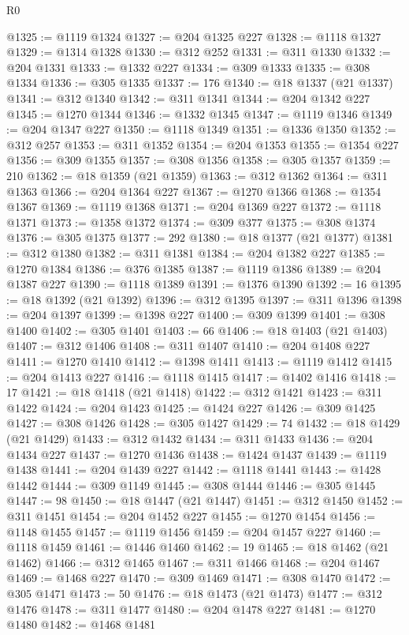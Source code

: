 \begin{lexlean}{R0}
\begin{coremodule}
@1325 := @1119 @1324
@1327 := @204 @1325 @227
@1328 := @1118 @1327
@1329 := @1314 @1328
@1330 := @312 @252
@1331 := @311 @1330
@1332 := @204 @1331
@1333 := @1332 @227
@1334 := @309 @1333
@1335 := @308 @1334
@1336 := @305 @1335
@1337 := 176
@1340 := @18 @1337 (@21 @1337)
@1341 := @312 @1340
@1342 := @311 @1341
@1344 := @204 @1342 @227
@1345 := @1270 @1344
@1346 := @1332 @1345
@1347 := @1119 @1346
@1349 := @204 @1347 @227
@1350 := @1118 @1349
@1351 := @1336 @1350
@1352 := @312 @257
@1353 := @311 @1352
@1354 := @204 @1353
@1355 := @1354 @227
@1356 := @309 @1355
@1357 := @308 @1356
@1358 := @305 @1357
@1359 := 210
@1362 := @18 @1359 (@21 @1359)
@1363 := @312 @1362
@1364 := @311 @1363
@1366 := @204 @1364 @227
@1367 := @1270 @1366
@1368 := @1354 @1367
@1369 := @1119 @1368
@1371 := @204 @1369 @227
@1372 := @1118 @1371
@1373 := @1358 @1372
@1374 := @309 @377
@1375 := @308 @1374
@1376 := @305 @1375
@1377 := 292
@1380 := @18 @1377 (@21 @1377)
@1381 := @312 @1380
@1382 := @311 @1381
@1384 := @204 @1382 @227
@1385 := @1270 @1384
@1386 := @376 @1385
@1387 := @1119 @1386
@1389 := @204 @1387 @227
@1390 := @1118 @1389
@1391 := @1376 @1390
@1392 := 16
@1395 := @18 @1392 (@21 @1392)
@1396 := @312 @1395
@1397 := @311 @1396
@1398 := @204 @1397
@1399 := @1398 @227
@1400 := @309 @1399
@1401 := @308 @1400
@1402 := @305 @1401
@1403 := 66
@1406 := @18 @1403 (@21 @1403)
@1407 := @312 @1406
@1408 := @311 @1407
@1410 := @204 @1408 @227
@1411 := @1270 @1410
@1412 := @1398 @1411
@1413 := @1119 @1412
@1415 := @204 @1413 @227
@1416 := @1118 @1415
@1417 := @1402 @1416
@1418 := 17
@1421 := @18 @1418 (@21 @1418)
@1422 := @312 @1421
@1423 := @311 @1422
@1424 := @204 @1423
@1425 := @1424 @227
@1426 := @309 @1425
@1427 := @308 @1426
@1428 := @305 @1427
@1429 := 74
@1432 := @18 @1429 (@21 @1429)
@1433 := @312 @1432
@1434 := @311 @1433
@1436 := @204 @1434 @227
@1437 := @1270 @1436
@1438 := @1424 @1437
@1439 := @1119 @1438
@1441 := @204 @1439 @227
@1442 := @1118 @1441
@1443 := @1428 @1442
@1444 := @309 @1149
@1445 := @308 @1444
@1446 := @305 @1445
@1447 := 98
@1450 := @18 @1447 (@21 @1447)
@1451 := @312 @1450
@1452 := @311 @1451
@1454 := @204 @1452 @227
@1455 := @1270 @1454
@1456 := @1148 @1455
@1457 := @1119 @1456
@1459 := @204 @1457 @227
@1460 := @1118 @1459
@1461 := @1446 @1460
@1462 := 19
@1465 := @18 @1462 (@21 @1462)
@1466 := @312 @1465
@1467 := @311 @1466
@1468 := @204 @1467
@1469 := @1468 @227
@1470 := @309 @1469
@1471 := @308 @1470
@1472 := @305 @1471
@1473 := 50
@1476 := @18 @1473 (@21 @1473)
@1477 := @312 @1476
@1478 := @311 @1477
@1480 := @204 @1478 @227
@1481 := @1270 @1480
@1482 := @1468 @1481

\end{coremodule}
\end{lexlean}
